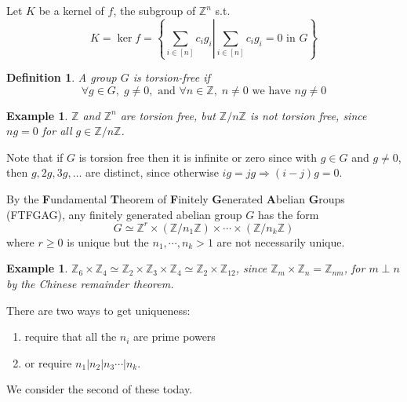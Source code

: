 \documentclass[11pt,english]{article}
\newtheorem{definition}[theorem]{Definition}
\newtheorem{example}[theorem]{Example}
\newcommand{\Z}{\mathbb Z}  %
\begin{document}
Let $K$ be a kernel of $f$, the subgroup of $\mathbb{Z}^{n}$ s.t.\[
K=\ker f=\left\{ \left.\sum_{i\in\left[n\right]}c_{i}g_{i}\right|\sum_{i\in\left[n\right]}c_{i}g_{i}=0\text{ in }G\right\} \]


\begin{definition}

A group $G$ is \emph{torsion-free} if\[
\forall g\in G,\; g\neq0,\text{ and }\forall n\in\mathbb{Z},\; n\neq0\text{ we have }ng\neq0\]


\end{definition}

\begin{example}

$\mathbb{Z}$ and $\mathbb{Z}^{n}$ are torsion free, but $\mathbb{Z}/n\mathbb{Z}$
is not torsion free, since $ng=0$ for all $g \in \Z / n\Z$.

\end{example}

Note that if $G$ is torsion free then it is infinite or zero since
with $g\in G$ and $g\neq0$, then $g,2g,3g,\ldots$ are distinct,
since otherwise $ig=jg\Rightarrow\left(i-j\right)g=0$.

By the \textbf{F}undamental \textbf{T}heorem of \textbf{F}initely
\textbf{G}enerated \textbf{A}belian \textbf{G}roups (FTFGAG), any finitely generated abelian group $G$ has the form
\begin{equation}
G\simeq\mathbb{Z}^{r}\times\left(\mathbb{Z}/n_{1}\mathbb{Z}\right)\times\cdots\times\left(\mathbb{Z}/n_{k}\mathbb{Z}\right)\label{eq:FTFGAG}\end{equation}
where $r\ge0$ is unique but the $n_{1},\cdots,n_{k}>1$ are not necessarily
unique.

\begin{example}

$\mathbb{Z}_{6}\times\mathbb{Z}_{4}\simeq\mathbb{Z}_{2}\times\mathbb{Z}_{3}\times\mathbb{Z}_{4}\simeq\mathbb{Z}_{2}\times\mathbb{Z}_{12}$,
since $\mathbb{Z}_{m}\times\mathbb{Z}_{n}=\mathbb{Z}_{nm}$, for $m\perp n$
by the Chinese remainder theorem.

\end{example}

There are two ways to get uniqueness:
\begin{enumerate}
\item require that all the $n_{i}$ are prime powers\label{enu:unique_1}
\item or require $n_{1}|n_{2}|n_{3}\cdots|n_{k}$. \label{enu:unique_2}
\end{enumerate}
We consider the second of these today.
\end{document}
